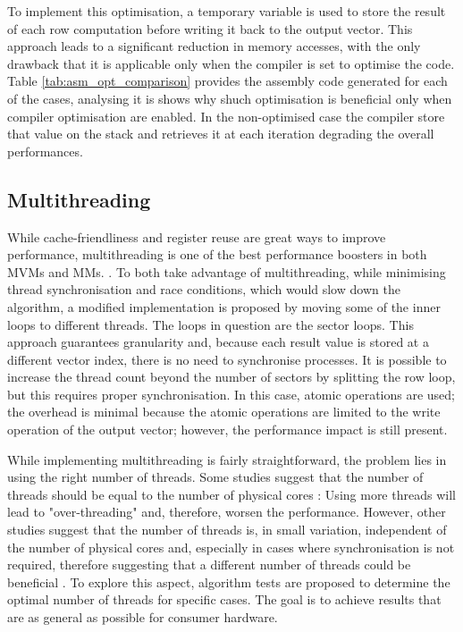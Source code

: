 To implement this optimisation, a temporary variable is used to store the result of each row computation before writing it back to the output vector.
This approach leads to a significant reduction in memory accesses, with the only drawback that it is applicable only when the compiler is set to optimise the code.
Table \ref{tab:asm_opt_comparison} provides the assembly code generated for each of the cases, analysing it is shows why shuch optimisation is beneficial only when compiler optimisation are enabled.
In the non-optimised case the compiler store that value on the stack and retrieves it at each iteration degrading the overall performances.\\

\subsection{Multithreading}\label{sec:multithread}
While cache-friendliness and register reuse are great ways to improve performance, multithreading is one of the best performance boosters in both MVMs and MMs.
\cite{yajnaseni_survey_2015,wyrzykowski_mathematical_2016,tang_multithreaded_2024,sulatycke_caching-efficient_1998}.
To both take advantage of multithreading, while minimising thread synchronisation and race conditions, which would slow down the algorithm, a modified implementation is proposed by moving some of the inner loops to different threads.
The loops in question are the sector loops.
This approach guarantees granularity and, because each result value is stored at a different vector index, there is no need to synchronise processes.
It is possible to increase the thread count beyond the number of sectors by splitting the row loop, but this requires proper synchronisation.
In this case, atomic operations are used; the overhead is minimal because the atomic operations are limited to the write operation of the output vector; however, the performance impact is still present.

While implementing multithreading is fairly straightforward, the problem lies in using the right number of threads.
Some studies suggest that the number of threads should be equal to the number of physical cores \cite{bhutani_exploring_2024}: Using more threads will lead to "over-threading" and, therefore, worsen the performance.
However, other studies suggest that the number of threads is, in small variation, independent of the number of physical cores and, especially in cases where synchronisation is not required, therefore suggesting that a different number of threads could be beneficial  \cite{cooper_how_2011}.
To explore this aspect, algorithm tests are proposed to determine the optimal number of threads for specific cases. The goal is to achieve results that are as general as possible for consumer hardware.


